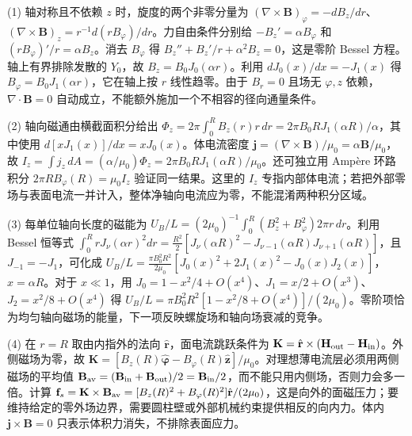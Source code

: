 (1) 轴对称且不依赖 \(z\) 时，旋度的两个非零分量为 \((\nabla\times\mathbf B)_\varphi=-dB_z/dr\)、\((\nabla\times\mathbf B)_z=r^{-1}d(rB_\varphi)/dr\)。力自由条件分别给 \(-B_z'=\alpha B_\varphi\) 和 \((rB_\varphi)'/r=\alpha B_z\)。消去 \(B_\varphi\) 得 \(B_z''+B_z'/r+\alpha^2B_z=0\)，这是零阶 Bessel 方程。轴上有界排除发散的 \(Y_0\)，故 \(B_z=B_0J_0(\alpha r)\)。利用 \(dJ_0(x)/dx=-J_1(x)\) 得 \(B_\varphi=B_0J_1(\alpha r)\)，它在轴上按 \(r\) 线性趋零。由于 \(B_r=0\) 且场无 \(\varphi,z\) 依赖，\(\nabla\cdot\mathbf B=0\) 自动成立，不能额外施加一个不相容的径向通量条件。

(2) 轴向磁通由横截面积分给出 \(\Phi_z=2\pi\int_0^R B_z(r)r\,dr=2\pi B_0RJ_1(\alpha R)/\alpha\)，其中使用 \(d[xJ_1(x)]/dx=xJ_0(x)\)。体电流密度 \(\mathbf j=(\nabla\times\mathbf B)/\mu_0=\alpha\mathbf B/\mu_0\)，故 \(I_z=\int j_z\,dA=(\alpha/\mu_0)\Phi_z=2\pi B_0RJ_1(\alpha R)/\mu_0\)。还可独立用 Ampère 环路积分 \(2\pi R B_\varphi(R)=\mu_0I_z\) 验证同一结果。这里的 \(I_z\) 专指内部体电流；若把外部零场与表面电流一并计入，整体净轴向电流应为零，不能混淆两种积分区域。

(3) 每单位轴向长度的磁能为 \(U_B/L=(2\mu_0)^{-1}\int_0^R(B_z^2+B_\varphi^2)2\pi r\,dr\)。利用 Bessel 恒等式 \(\int_0^R rJ_\nu(\alpha r)^2dr=\tfrac{R^2}{2}[J_\nu(\alpha R)^2-J_{\nu-1}(\alpha R)J_{\nu+1}(\alpha R)]\)，且 \(J_{-1}=-J_1\)，可化成 \(\displaystyle U_B/L=\frac{\pi B_0^2R^2}{2\mu_0}[J_0(x)^2+2J_1(x)^2-J_0(x)J_2(x)]\)，\(x=\alpha R\)。对于 \(x\ll1\)，用 \(J_0=1-x^2/4+O(x^4)\)、\(J_1=x/2+O(x^3)\)、\(J_2=x^2/8+O(x^4)\) 得 \(U_B/L=\pi B_0^2R^2[1-x^2/8+O(x^4)]/(2\mu_0)\)。零阶项恰为均匀轴向磁场的能量，下一项反映螺旋场和轴向场衰减的竞争。

(4) 在 \(r=R\) 取由内指外的法向 \(\hat{\mathbf r}\)，面电流跳跃条件为 \(\mathbf K=\hat{\mathbf r}\times(\mathbf H_{\rm out}-\mathbf H_{\rm in})\)。外侧磁场为零，故 \(\mathbf K=[B_z(R)\hat{\boldsymbol\varphi}-B_\varphi(R)\hat{\mathbf z}]/\mu_0\)。对理想薄电流层必须用两侧磁场的平均值 \(\mathbf B_{\rm av}=(\mathbf B_{\rm in}+\mathbf B_{\rm out})/2=\mathbf B_{\rm in}/2\)，而不能只用内侧场，否则力会多一倍。计算 \(\mathbf f_s=\mathbf K\times\mathbf B_{\rm av}=[B_z(R)^2+B_\varphi(R)^2]\hat{\mathbf r}/(2\mu_0)\)，这是向外的面磁压力；要维持给定的零外场边界，需要圆柱壁或外部机械约束提供相反的向内力。体内 \(\mathbf j\times\mathbf B=0\) 只表示体积力消失，不排除表面应力。
